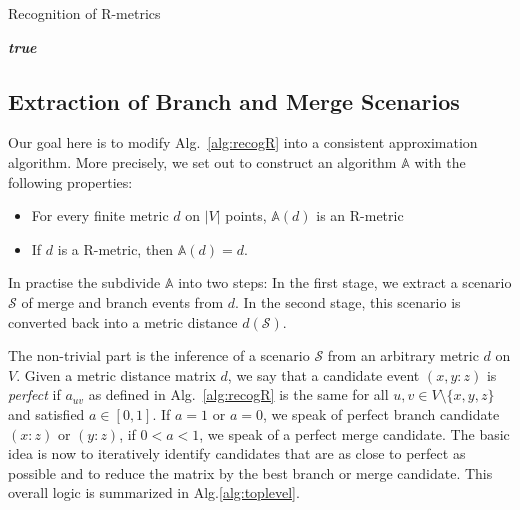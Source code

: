 \documentclass[amsmath]{lni}
\newcommand{\TODO}[1]{\begingroup\color{red}#1\endgroup}
\begin{document}
\begin{algorithm}[H]
\caption{Recognition of R-metrics}
\label{alg:recogR}
\SetAlgoLined

\Return \emph{\textbf{true}}
\end{algorithm}

\subsection{Extraction of Branch and Merge Scenarios} 

Our goal here is to modify Alg.~\ref{alg:recogR} into a consistent
approximation algorithm. More precisely, we set out to construct an
algorithm $\mathbb{A}$ with the following properties:
\begin{itemize} 
  \item For every finite metric $d$ on $|V|$ points, $\mathbb{A}(d)$ 
    is an R-metric
  \item If $d$ is a R-metric, then $\mathbb{A}(d)=d$.
\end{itemize} 
In practise the subdivide $\mathbb{A}$ into two steps: In the first stage,
we extract a scenario $\mathcal{S}$ of merge and branch events from $d$. In
the second stage, this scenario is converted back into a metric distance
$d(\mathcal{S})$.

The non-trivial part is the inference of a scenario $\mathcal{S}$ from an
arbitrary metric $d$ on $V$. Given a metric distance matrix $d$, we say
that a candidate event $(x,y:z)$ is \emph{perfect} if $a_{uv}$ as defined
in Alg.~\ref{alg:recogR} is the same for all $u,v\in V\setminus\{x,y,z\}$
and satisfied $a\in [0,1]$. If $a=1$ or $a=0$, we speak of perfect branch
candidate $(x:z)$ or $(y:z)$, if $0<a<1$, we speak of a perfect merge
candidate. The basic idea is now to iteratively identify candidates that
are as close to perfect as possible and to reduce the matrix by the best
branch or merge candidate. This overall logic is summarized in
Alg.\ref{alg:toplevel}.
\end{document}
